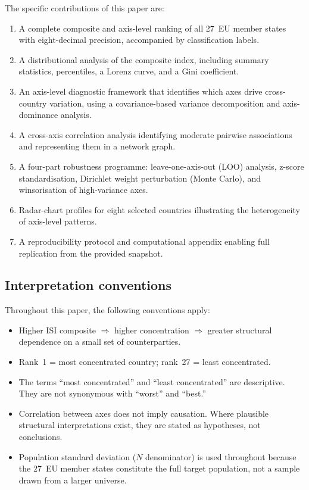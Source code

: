 The specific contributions of this paper are:

\begin{enumerate}[leftmargin=2em]
  \item A complete composite and axis-level ranking of all 27~EU
    member states with eight-decimal precision, accompanied by
    classification labels.
  \item A distributional analysis of the composite index, including
    summary statistics, percentiles, a Lorenz curve, and a Gini
    coefficient.
  \item An axis-level diagnostic framework that identifies which axes
    drive cross-country variation, using a covariance-based variance
    decomposition and axis-dominance analysis.
  \item A cross-axis correlation analysis identifying moderate
    pairwise associations and representing them in a network graph.
  \item A four-part robustness programme: leave-one-axis-out (LOO)
    analysis, z-score standardisation, Dirichlet weight perturbation
    (Monte Carlo), and winsorisation of high-variance axes.
  \item Radar-chart profiles for eight selected countries illustrating
    the heterogeneity of axis-level patterns.
  \item A reproducibility protocol and computational appendix enabling
    full replication from the provided snapshot.
\end{enumerate}

\subsection{Interpretation conventions}

Throughout this paper, the following conventions apply:

\begin{itemize}[leftmargin=2em]
  \item Higher ISI composite $\Rightarrow$ higher concentration
    $\Rightarrow$ greater structural dependence on a small set of
    counterparties.
  \item Rank~1 = most concentrated country; rank~27 = least
    concentrated.
  \item The terms ``most concentrated'' and ``least concentrated'' are
    descriptive.  They are not synonymous with ``worst'' and ``best.''
  \item Correlation between axes does not imply causation.  Where
    plausible structural interpretations exist, they are stated as
    hypotheses, not conclusions.
  \item Population standard deviation ($N$ denominator) is used
    throughout because the 27~EU member states constitute the full
    target population, not a sample drawn from a larger universe.
\end{itemize}

